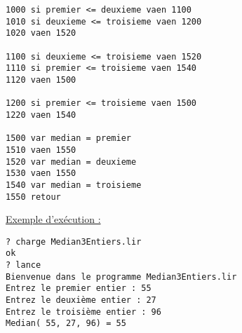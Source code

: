 \begin{enumerate}
\begin{verbatim}
1000 si premier <= deuxieme vaen 1100
1010 si deuxieme <= troisieme vaen 1200
1020 vaen 1520
        
1100 si deuxieme <= troisieme vaen 1520
1110 si premier <= troisieme vaen 1540
1120 vaen 1500
        
1200 si premier <= troisieme vaen 1500
1220 vaen 1540

1500 var median = premier
1510 vaen 1550
1520 var median = deuxieme
1530 vaen 1550
1540 var median = troisieme
1550 retour
\end{verbatim}
    \underline{Exemple d'exécution :}
\begin{verbatim}
? charge Median3Entiers.lir
ok
? lance
Bienvenue dans le programme Median3Entiers.lir
Entrez le premier entier : 55
Entrez le deuxième entier : 27
Entrez le troisième entier : 96
Median( 55, 27, 96) = 55
\end{verbatim}
\end{enumerate}

